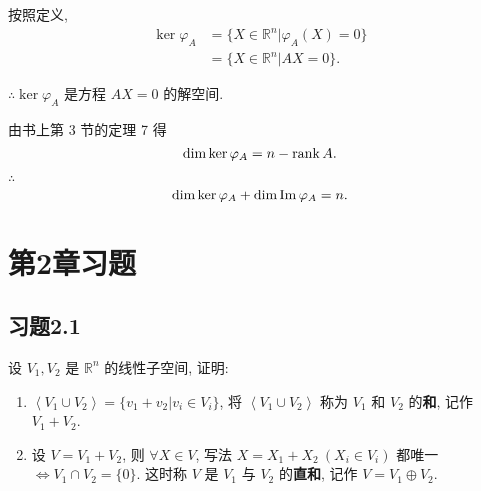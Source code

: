 \documentclass{ctexart}
\begin{document}
按照定义,
\begin{align*}
    \ker\varphi_A & =\{X\in\mathbb{R}^n|\varphi_A(X)=0\} \\
    & =\{X\in\mathbb{R}^n|AX=0\}.
\end{align*}

$\therefore\ker\varphi_A$ 是方程 $AX=0$ 的解空间.

由书上第 3 节的定理 7 得
\[\dim\ker\varphi_A=n-\operatorname{rank} A.\]

$\therefore$
\[\dim\ker\varphi_A+\dim\operatorname{Im} \varphi_A=n.\]
\section{第2章习题}
\subsection{习题2.1}
\begin{exercise}[有改动]\label{ex1.1}
    设 $V_1,V_2$ 是 $\mathbb{R}^n$ 的线性子空间, 证明:
    \begin{enumerate}
        \def\labelenumi{(\arabic{enumi})}
        \item $\left<V_1\cup V_2\right>=\{v_1+v_2|v_i\in V_i\}$, 将 $\left<V_1\cup V_2\right>$ 称为 $V_1$ 和 $V_2$ 的\textbf{和}, 记作 $V_1+V_2$.
        \item 设 $V=V_1+V_2$, 则 $\forall X\in V$, 写法 $X=X_1+X_2\ (X_i\in V_i)$ 都唯一 $\Leftrightarrow V_1\cap V_2=\{0\}$. 这时称 $V$ 是 $V_1$ 与 $V_2$ 的\textbf{直和}, 记作 $V=V_1\oplus V_2$.
    \end{enumerate}
\end{exercise}
\end{document}
